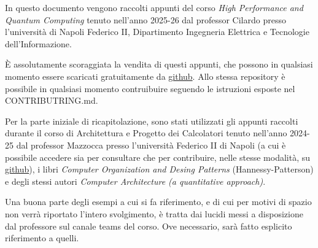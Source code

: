 In questo documento vengono raccolti appunti del corso \textit{High Performance and Quantum Computing} tenuto nell'anno 2025-26 dal professor Cilardo presso l'università di Napoli Federico II, Dipartimento Ingegneria Elettrica e Tecnologie dell'Informazione.

\noindent \uppercase{è} assolutamente scoraggiata la vendita di questi appunti, che possono in qualsiasi momento essere scaricati gratuitamente da \href{https://github.com/h-tajato/hpqc_notes}{github}. Allo stessa repository è possibile in qualsiasi momento contruibuire seguendo le istruzioni esposte nel CONTRIBUTRING.md.

\noindent Per la parte iniziale di ricapitolazione, sono stati utilizzati gli appunti raccolti durante il corso di Architettura e Progetto dei Calcolatori tenuto nell'anno 2024-25 dal professor Mazzocca presso l'università Federico II di Napoli (a cui è possibile accedere sia per consultare che per contribuire, nelle stesse modalità, su \href{https://github.com/Agda78/APC-appunti}{github}), i libri \textit{Computer Organization and Desing Patterns} (Hannessy-Patterson) e degli stessi autori \textit{Computer Architecture (a quantitative approach)}.

\noindent Una buona parte degli esempi a cui si fa riferimento, e di cui per motivi di spazio non verrà riportato l'intero svolgimento, è tratta dai lucidi messi a disposizione dal professore sul canale teams del corso. Ove necessario, sarà fatto esplicito riferimento a quelli. 
